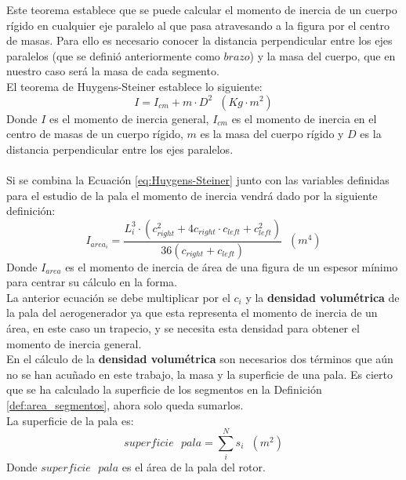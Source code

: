 Este teorema establece que se puede calcular el momento de inercia de un cuerpo rígido en cualquier eje paralelo al que pasa atravesando a la figura por el centro de masas. Para ello es necesario conocer la distancia perpendicular entre los ejes paralelos (que se definió anteriormente como $brazo$) y la masa del cuerpo, que en nuestro caso será la masa de cada segmento. \\

El teorema de Huygens-Steiner establece lo siguiente:
 \begin{equation}
    I = I_{cm} + m \cdot D^2 \hspace{7pt} (Kg \cdot m^2)
 \label{eq:Huygens-Steiner}
 \end{equation}
 Donde $I$ es el momento de inercia general, $I_{cm}$ es el momento de inercia en el centro de masas de un cuerpo rígido, $m$ es la masa del cuerpo rígido y $D$ es la distancia perpendicular entre los ejes paralelos.\\\\
 

Si se combina la Ecuación \ref{eq:Huygens-Steiner} junto con las variables definidas para el estudio de la pala el momento de inercia vendrá dado por la siguiente definición:
 \begin{equation}
  I_{area_i} = \dfrac{ L_{i}^3 \cdot (c_{right}^2 + 4 c_{right} \cdot c_{left} + c_{left}^2)}{ 36 (c_{right} + c_{left})} \hspace{7pt} (m^4)
 \label{def:momento_inercia_area}
 \end{equation}
 Donde $I_{area}$ es el momento de inercia de área de una figura de un espesor mínimo para centrar su cálculo en la forma.\\
 
 La anterior ecuación se debe multiplicar por el \textbf{$c_i$} y la \textbf{densidad volumétrica} de la pala del aerogenerador ya que esta representa el momento de inercia de un área, en este caso un trapecio, y se necesita esta densidad para obtener el momento de inercia general.\\

En el cálculo de la \textbf{densidad volumétrica} son necesarios dos términos que aún no se han acuñado en este trabajo, la masa y la superficie de una pala. Es cierto que se ha calculado la superficie de los segmentos en la Definición \ref{def:area_segmentos}, ahora solo queda sumarlos.\\


La superficie de la pala es:
 \begin{equation}
 superficie \text{ } pala = \sum_{i}^{N}s_i \hspace{7pt} (m^2)  
 \label{def:superficie_pala}
 \end{equation}
  Donde $ superficie \text{ } pala $ es el área de la pala del rotor.\\

